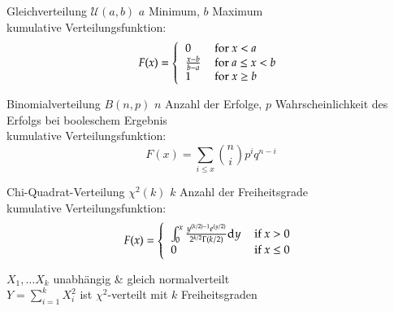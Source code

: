 \documentclass{beamer}
\begin{document}
\begin{frame}{\insertsection}
\begin{block}{Gleichverteilung $\mathcal{U}(a,b)$}
	$a$ Minimum, $b$ Maximum \\
	kumulative Verteilungsfunktion:
	\begin{equation*}
	F(x) = \left\{\begin{tabular}{ll}
	0 & for $x<a$ \\
	$\frac{x-b}{b-a}$ & for $a\leq x<b$ \\
	1 & for $x\geq b$ \\
	\end{tabular}\right.
	\end{equation*}
\end{block}
\end{frame}

\begin{frame}{\insertsection}
\begin{block}{Binomialverteilung $B(n,p)$}
	$n$ Anzahl der Erfolge, $p$ Wahrscheinlichkeit des Erfolgs bei booleschem Ergebnis \\
	kumulative Verteilungsfunktion:
	\begin{equation*}
	F(x) = \sum_{i\leq x} \genfrac(){0pt}{}{n}{i} p^{i}q^{n-i}
	\end{equation*}
\end{block}
\end{frame}


\begin{frame}{\insertsection}
\begin{block}{Chi-Quadrat-Verteilung $\chi^2(k)$}
	$k$ Anzahl der Freiheitsgrade \\
	kumulative Verteilungsfunktion:
	\begin{equation*}
	F(x) = \left\{\begin{tabular}{ll}
	$\int_{0}^{x} \frac{y^{(k/2)-1}e^{(y/2)}}{2^{k/2}\Gamma(k/2)}\textrm{d}y$ & if $x>0$ \\
	0 & if $x\leq 0$
	\end{tabular}\right.
	\end{equation*}
\end{block}
\begin{example}
	$X_1, \ldots X_k$ unabhängig \& gleich normalverteilt \\
	$Y = \sum_{i=1}^{k}X_i^2$ ist $\chi^2$-verteilt mit $k$ Freiheitsgraden
\end{example}
\end{frame}
\end{document}
